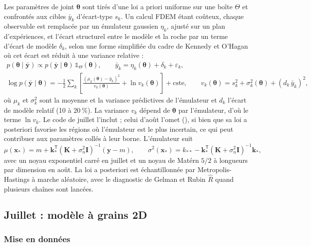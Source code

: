 Les paramètres de joint $\boldsymbol\theta$ sont tirés d'une loi a priori uniforme sur une boîte $\Theta$ et confrontés aux cibles $\bar y_k$ d'écart-type $s_k$. Un calcul FDEM étant coûteux, chaque observable est remplacée par un émulateur gaussien $\eta_k$, ajusté sur un plan d'expériences, et l'écart structurel entre le modèle et la roche par un terme d'écart de modèle $\delta_k$, selon une forme simplifiée du cadre de Kennedy et O'Hagan où cet écart est réduit à une variance relative :
\begin{gather}
p(\boldsymbol\theta \mid \bar{\mathbf y}) \propto p(\bar{\mathbf y} \mid \boldsymbol\theta)\, \mathbb 1_\Theta(\boldsymbol\theta), \qquad
\bar y_k = \eta_k(\boldsymbol\theta) + \delta_k + \varepsilon_k, \\
\log p(\bar{\mathbf y} \mid \boldsymbol\theta) = -\frac12 \sum_k \left[\frac{\left(\mu_k(\boldsymbol\theta) - \bar y_k\right)^2}{v_k(\boldsymbol\theta)} + \ln v_k(\boldsymbol\theta)\right] + \text{cste}, \qquad
v_k(\boldsymbol\theta) = s_k^2 + \sigma_k^2(\boldsymbol\theta) + (d_k\,\bar y_k)^2,
\end{gather}
où $\mu_k$ et $\sigma_k^2$ sont la moyenne et la variance prédictives de l'émulateur et $d_k$ l'écart de modèle relatif (10 à $20~\%$). La variance $v_k$ dépend de $\boldsymbol\theta$ par l'émulateur, d'où le terme $\ln v_k$. Le code de juillet l'inclut ; celui d'août l'omet (), si bien que sa loi a posteriori favorise les régions où l'émulateur est le plus incertain, ce qui peut contribuer aux paramètres collés à leur borne. L'émulateur suit
\begin{equation}
\mu(\mathbf x_*) = m + \mathbf k_*^{\mathsf T}(\mathbf K + \sigma_n^2\mathbf I)^{-1}(\mathbf y - m), \qquad
\sigma^2(\mathbf x_*) = k_{**} - \mathbf k_*^{\mathsf T}(\mathbf K + \sigma_n^2\mathbf I)^{-1}\mathbf k_*,
\end{equation}
avec un noyau exponentiel carré en juillet et un noyau de Matérn $5/2$ à longueurs par dimension en août. La loi a posteriori est échantillonnée par Metropolis-Hastings à marche aléatoire, avec le diagnostic de Gelman et Rubin $\hat R$ quand plusieurs chaînes sont lancées.

\subsection{Juillet : modèle à grains 2D}

\subsubsection{Mise en données}

